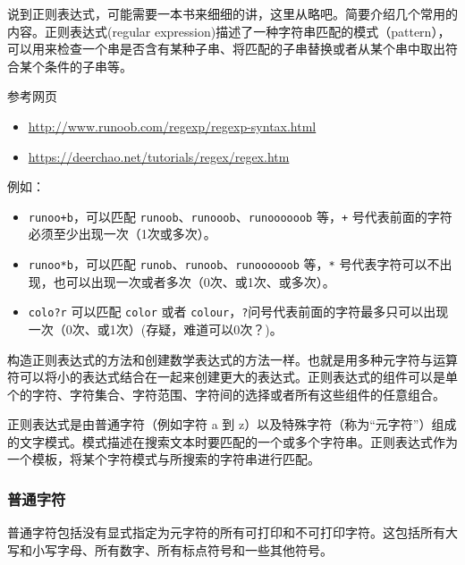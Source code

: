\documentclass[doctor,openright,twoside]{sjtuthesis}
\providecommand{\tightlist}{%
    \setlength{\itemsep}{0pt}\setlength{\parskip}{0pt}}
\newcommand{\passthrough}[1]{#1}
\theoremstyle{plain}
\theoremstyle{definition}
\theoremstyle{remark}
\theoremstyle{ocrenumbox}
\theoremstyle{plain}
\begin{document}
说到正则表达式，可能需要一本书来细细的讲，这里从略吧。简要介绍几个常用的内容。正则表达式(regular
expression)描述了一种字符串匹配的模式（pattern），可以用来检查一个串是否含有某种子串、将匹配的子串替换或者从某个串中取出符合某个条件的子串等。

参考网页

\begin{itemize}
\tightlist
\item
  \url{http://www.runoob.com/regexp/regexp-syntax.html}
\item
  \url{https://deerchao.net/tutorials/regex/regex.htm}
\end{itemize}

例如：

\begin{itemize}
\tightlist
\item
  \passthrough{\lstinline!runoo+b!}，可以匹配
  \passthrough{\lstinline!runoob!}、\passthrough{\lstinline!runooob!}、\passthrough{\lstinline!runoooooob!}
  等，\passthrough{\lstinline!+!}
  号代表前面的字符必须至少出现一次（1次或多次）。
\item
  \passthrough{\lstinline!runoo*b!}，可以匹配
  \passthrough{\lstinline!runob!}、\passthrough{\lstinline!runoob!}、\passthrough{\lstinline!runoooooob!}
  等，\passthrough{\lstinline!*!}
  号代表字符可以不出现，也可以出现一次或者多次（0次、或1次、或多次）。
\item
  \passthrough{\lstinline!colo?r!} 可以匹配
  \passthrough{\lstinline!color!} 或者
  \passthrough{\lstinline!colour!}，\passthrough{\lstinline!?!}问号代表前面的字符最多只可以出现一次（0次、或1次）(存疑，难道可以0次？)。
\end{itemize}

构造正则表达式的方法和创建数学表达式的方法一样。也就是用多种元字符与运算符可以将小的表达式结合在一起来创建更大的表达式。正则表达式的组件可以是单个的字符、字符集合、字符范围、字符间的选择或者所有这些组件的任意组合。

正则表达式是由普通字符（例如字符 a 到
z）以及特殊字符（称为``元字符''）组成的文字模式。模式描述在搜索文本时要匹配的一个或多个字符串。正则表达式作为一个模板，将某个字符模式与所搜索的字符串进行匹配。

\subsubsection{普通字符}

普通字符包括没有显式指定为元字符的所有可打印和不可打印字符。这包括所有大写和小写字母、所有数字、所有标点符号和一些其他符号。
\end{document}
